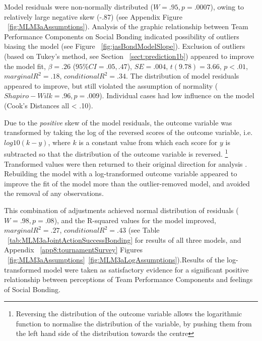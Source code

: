 \begin{CJK}{UTF8}{gbsn}
Model residuals were non-normally distributed ($W = .95, p = .0007$), owing to relatively large negative skew (-.87) (see Appendix Figure ~\ref{fig:MLM3aAssumptions}).  Analysis of the graphic relationship between Team Performance Components on Social Bonding indicated possibility of outliers biasing the model (see Figure ~\ref{fig:jasBondModelSlope}).
Exclusion of outliers (based on Tukey's method, see Section ~\ref{sect:prediction1b}) appeared to improve the model fit, $\beta = .26$ ($95\% CI =  .05, .47$), $SE = .004$, $t(9.78) = 3.66$, $p < .01$, $marginal R^2 = .18$, $conditional R^2 = .34$.  The distribution of model residuals appeared to improve, but still violated the assumption of normality ($Shapiro-Wilk = .96, p = .009$).  Individual cases had low influence on the model (Cook's Distances all < .10).

Due to the \textit{positive} skew of the model residuals, the outcome variable was transformed by taking the log of the reversed scores of the outcome variable, i.e. $log10(k - y)$, where $k$ is a constant value from which each score for $y$ is subtracted so that the distribution of the outcome variable is reversed\citep{Howell2012}.
  \footnote{Reversing the distribution of the outcome variable allows the logarithmic function to normalise the distribution of the variable, by pushing them from the left hand side of the distribution towards the centre}
Transformed values were then returned to their original direction for analysis \citep{Field2012}.  Rebuilding the model with a log-transformed outcome variable appeared to improve the fit of the model more than the outlier-removed model, and avoided the removal of any observations.

This combination of adjustments achieved normal distribution of residuals ($W = .98, p = .08$), and the R-squared values for the model improved, $marginal R^2 = .27$, $conditional R^2 = .43$ (see Table ~\ref{tab:MLM3aJointActionSuccessBonding} for results of all three models, and Appendix ~\ref{app8:tournamentSurvey} Figures ~\ref{fig:MLM3aAssumptions}\nobreakdash~\ref{fig:MLM3aLogAssumptions}).Results of the log-transformed model were taken as satisfactory evidence for a significant positive relationship between perceptions of Team Performance Components and feelings of Social Bonding.


\end{CJK}
